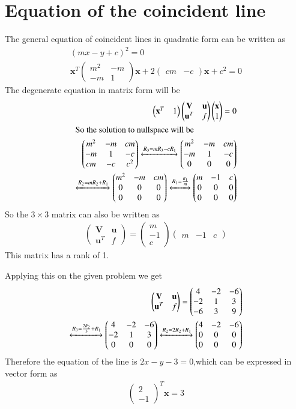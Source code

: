 \documentclass[journal,12pt,twocolumn]{IEEEtran}
\providecommand{\brak}[1]{\ensuremath{\left(#1\right)}}
\newcommand{\myvec}[1]{\ensuremath{\begin{pmatrix}#1\end{pmatrix}}}
\numberwithin{equation}{subsection}
\let\vec\mathbf
\begin{document}
\section{Equation of the coincident line}
The general equation of coincident lines in quadratic form can be written as
\begin{align}
    \brak{mx-y+c}^2=0\\
    \vec{x}^T\myvec{m^2&-m\\-m&1}\vec{x}+2\myvec{cm&-c}\vec{x}+c^2=0
\end{align}
The degenerate equation in matrix form will be 
\begin{align}
    \myvec{\vec{x}^T&1}\myvec{\vec{V}&\vec{u}\\\vec{u}^T&f}\myvec{\vec{x}\\1}=0\\
    \intertext{So the solution to nullspace will be}
    \myvec{m^2&-m&cm\\-m&1&-c\\cm&-c&c^2}\xleftrightarrow{R_3=mR_3-cR_1}\myvec{m^2&-m&cm\\-m&1&-c\\0&0&0}\\
    \xleftrightarrow{R_2=mR_2+R_1}\myvec{m^2&-m&cm\\0&0&0\\0&0&0}\xleftrightarrow{R_1=\frac{R_1}{m}}\myvec{m&-1&c\\0&0&0\\0&0&0}
\end{align}
So the $3\times 3$ matrix can also be written as
\begin{align}
    \myvec{\vec{V}&\vec{u}\\\vec{u}^T&f}=\myvec{m\\-1\\c}\myvec{m&-1&c}
\end{align}
This matrix has a rank of 1.\par
Applying this on the given problem we get
\begin{align}
    \myvec{\vec{V}&\vec{u}\\\vec{u}^T&f}=\myvec{4&-2&-6\\-2&1&3\\-6&3&9}\\
    \xleftrightarrow{R_3=\frac{2R_2}{3}+R_1}\myvec{4&-2&-6\\-2&1&3\\0&0&0}\xleftrightarrow{R_2=2R_2+R_1}\myvec{4&-2&-6\\0&0&0\\0&0&0}
\end{align}
Therefore the equation of the line is $2x-y-3=0$,which can be expressed in vector form as
\begin{align}
    \myvec{2\\-1}^T\vec{x}=3
\end{align}
\end{document}
